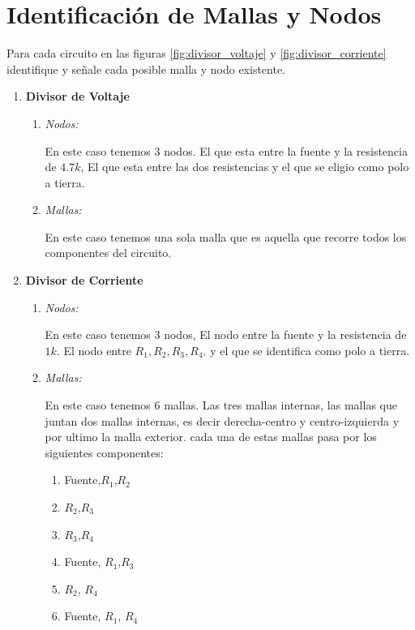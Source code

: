 \documentclass[a4paper, amsfonts, amssymb, amsmath, reprint, showkeys, nofootinbib, twoside]{revtex4-1}
\begin{document}
\section{Identificación de Mallas y Nodos}

Para cada circuito en las figuras \ref{fig:divisor_voltaje} y \ref{fig:divisor_corriente} identifique y señale cada posible malla y nodo existente.

\begin{enumerate}
  \item \textbf{Divisor de Voltaje}
    \begin{enumerate}
      \item \textit{Nodos:}

	En este caso tenemos 3 nodos. El que esta entre la fuente y la resistencia de $4.7k$, El que esta entre las dos resistencias y el que se eligio como polo a tierra.
	
      \item \textit{Mallas:}

	En este caso tenemos una sola malla que es aquella que recorre todos los componentes del circuito.
    \end{enumerate}
  \item \textbf{Divisor de Corriente}
    \begin{enumerate}
      \item \textit{Nodos:}

	En este caso tenemos 3 nodos, El nodo entre la fuente y la resistencia de $1k$. El nodo entre $R_1,R_2,R_3,R_4$. y el que se identifica como polo a tierra.

      \item \textit{Mallas:}

	En este caso tenemos 6 mallas. Las tres mallas internas, las mallas que juntan dos mallas internas, es decir derecha-centro y centro-izquierda y por ultimo la malla exterior. cada una de estas mallas pasa por los siguientes componentes:
	\begin{enumerate}
	  \item Fuente,$R_1$,$R_2$ 
	  \item $R_2$,$R_3$ 
	  \item $R_3$,$R_4$ 
	  \item Fuente, $R_1$,$R_3$ 
	  \item $R_2$, $R_4$
	  \item Fuente, $R_1$, $R_4$ 
	\end{enumerate}
    \end{enumerate}
\end{enumerate}
\end{document}
